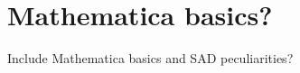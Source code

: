 \documentclass{article}
\begin{document}


\section{Mathematica basics?}
Include Mathematica basics and SAD peculiarities? 


%
%
%
%
\end{document}
